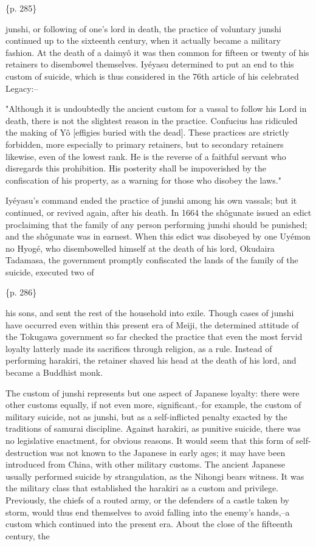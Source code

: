 \{p. 285\}

junshi, or following of one's lord in death, the practice of voluntary junshi continued up to the sixteenth century, when it actually became a military fashion. At the death of a daimyô it was then common for fifteen or twenty of his retainers to disembowel themselves. Iyéyasu determined to put an end to this custom of suicide, which is thus considered in the 76th article of his celebrated Legacy:--

"Although it is undoubtedly the ancient custom for a vassal to follow his Lord in death, there is not the slightest reason in the practice. Confucius has ridiculed the making of Yô [effigies buried with the dead]. These practices are strictly forbidden, more especially to primary retainers, but to secondary retainers likewise, even of the lowest rank. He is the reverse of a faithful servant who disregards this prohibition. His posterity shall be impoverished by the confiscation of his property, as a warning for those who disobey the laws."

Iyéyasu's command ended the practice of junshi among his own vassals; but it continued, or revived again, after his death. In 1664 the shôgunate issued an edict proclaiming that the family of any person performing junshi should be punished; and the shôgunate was in earnest. When this edict was disobeyed by one Uyémon no Hyogé, who disembowelled himself at the death of his lord, Okudaira Tadamasa, the government promptly confiscated the lands of the family of the suicide, executed two of

\{p. 286\}

his sons, and sent the rest of the household into exile. Though cases of junshi have occurred even within this present era of Meiji, the determined attitude of the Tokugawa government so far checked the practice that even the most fervid loyalty latterly made its sacrifices through religion, as a rule. Instead of performing harakiri, the retainer shaved his head at the death of his lord, and became a Buddhist monk.



The custom of junshi represents but one aspect of Japanese loyalty: there were other customs equally, if not even more, significant,--for example, the custom of military suicide, not as junshi, but as a self-inflicted penalty exacted by the traditions of samurai discipline. Against harakiri, as punitive suicide, there was no legislative enactment, for obvious reasons. It would seem that this form of self-destruction was not known to the Japanese in early ages; it may have been introduced from China, with other military customs. The ancient Japanese usually performed suicide by strangulation, as the Nihongi bears witness. It was the military class that established the harakiri as a custom and privilege. Previously, the chiefs of a routed army, or the defenders of a castle taken by storm, would thus end themselves to avoid falling into the enemy's hands,--a custom which continued into the present era. About the close of the fifteenth century, the


